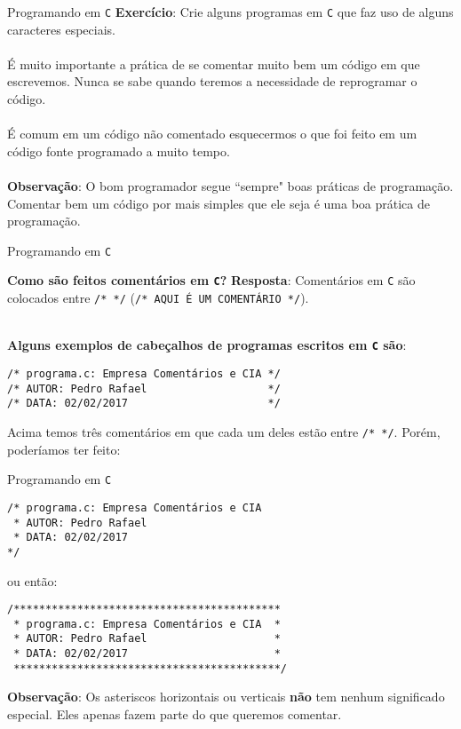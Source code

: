 \documentclass{beamer}
\newcommand{\C}{\texttt{C}}
\begin{document}
\begin{frame}{Programando em \C}
\textbf{Exercício}: Crie alguns programas em \texttt{C} que faz uso de alguns caracteres especiais.\\~\\

É muito importante a prática de se comentar muito bem um código em que escrevemos. Nunca se sabe quando teremos a necessidade de reprogramar o código.\\~\\

É comum em um código não comentado esquecermos o que foi feito em um código fonte programado a muito tempo. \\~\\

\textbf{Observação}: O bom programador segue ``sempre" boas práticas de programação. Comentar bem um código por mais simples que ele seja é uma boa prática de programação.
\end{frame}

\begin{frame}[fragile]{Programando em \C}
\begin{block}{\textbf{Como são feitos comentários em \C?}}
\textbf{Resposta}: Comentários em \texttt{C} são colocados entre \texttt{/* */} (\texttt{/* AQUI É UM COMENTÁRIO */}).\\~\\
\end{block}
\textbf{Alguns exemplos de cabeçalhos de programas escritos em \texttt{C} são}:

\begin{verbatim}
/* programa.c: Empresa Comentários e CIA */
/* AUTOR: Pedro Rafael                   */
/* DATA: 02/02/2017                      */
\end{verbatim}
Acima temos três comentários em que cada um deles estão entre \texttt{/* */}. Porém, poderíamos ter feito:
\end{frame}

\begin{frame}[fragile]{Programando em \C}
\begin{verbatim}
/* programa.c: Empresa Comentários e CIA
 * AUTOR: Pedro Rafael                   
 * DATA: 02/02/2017                      
*/
\end{verbatim}
ou então:
\begin{verbatim}
/******************************************
 * programa.c: Empresa Comentários e CIA  *
 * AUTOR: Pedro Rafael                    *
 * DATA: 02/02/2017                       *
 ******************************************/
\end{verbatim}
\textbf{Observação}: Os asteriscos horizontais ou verticais \textbf{não} tem nenhum significado especial. Eles apenas fazem parte do que queremos comentar.
\end{frame}
\end{document}
